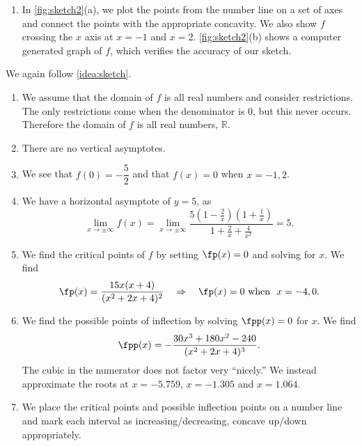 {\begin{enumerate}
\begin{center}
\end{center}
		
	\item	In \autoref{fig:sketch2}(a), we plot the points from the number line on a set of axes and connect the points with the appropriate concavity. We also show $f$ crossing the $x$ axis at $x=-1$ and $x=2$. \autoref{fig:sketch2}(b) shows a computer generated graph of $f$, which verifies the accuracy of our sketch.\eoehere
\end{enumerate}}

{We again follow \autoref{idea:sketch}.
	\begin{enumerate}
	\item	We assume that the domain of $f$ is all real numbers and consider restrictions. The only restrictions come when the denominator is 0, but this never occurs. Therefore the domain of $f$ is all real numbers, $\mathbb{R}$.
	\item	There are no vertical asymptotes.
	\item	We see that $f(0)=-\dfrac52$ and that $f(x)=0$ when $x=-1,2$.
	\item	We have a horizontal asymptote of $y=5$, as
	\[\lim_{x\to\pm\infty}f(x)=\lim_{x\to\pm\infty}\frac{5(1-\frac2x)(1+\frac1x)}{1+\frac2x+\frac4{x^2}}=5.\]
	\item	We find the critical points of $f$ by setting $\fp(x)=0$ and solving for $x$. We find 
	\[
	\fp(x) = \frac{15x(x+4)}{(x^2+2x+4)^2}
	\quad \Rightarrow \quad
	\fp(x) = 0 \text{ when } \ x=-4,0.
	\]
	\item	We find the possible points of inflection by solving $\fpp(x) = 0$ for $x$. We find
	\[\fpp(x) = -\frac{30x^3+180x^2-240}{(x^2+2x+4)^3}.\]
	The cubic in the numerator does not factor very ``nicely.'' We instead approximate the roots at $x= -5.759$, $x=-1.305$ and $x=1.064$.
			
	\item	We place the critical points and possible inflection points on a number line and mark each interval as increasing/decreasing, concave up/down appropriately.

\begin{center}
\end{center}	
	

\end{enumerate}}
